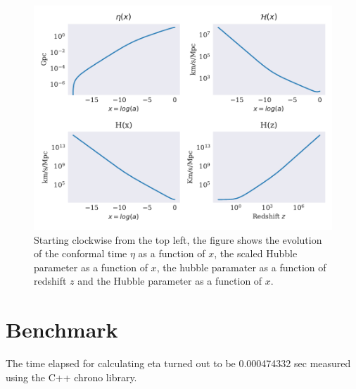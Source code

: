 \documentclass[onecolumn]{aastex62}
\begin{document}
\begin{figure}
    \includegraphics[scale=0.8]{figures/evolution.pdf}
    \caption{Starting clockwise from the top left, the figure shows the evolution of the conformal time $\eta$ as a function of $x$, the scaled Hubble parameter as a function of $x$, the hubble paramater as a function of redshift $z$ and the Hubble parameter as a function of $x$.}
    \label{fig:evolution}
\end{figure}
\section{Benchmark}
The time elapsed for calculating eta turned out to be 0.000474332 sec measured
using the C++ chrono library.




\end{document}
